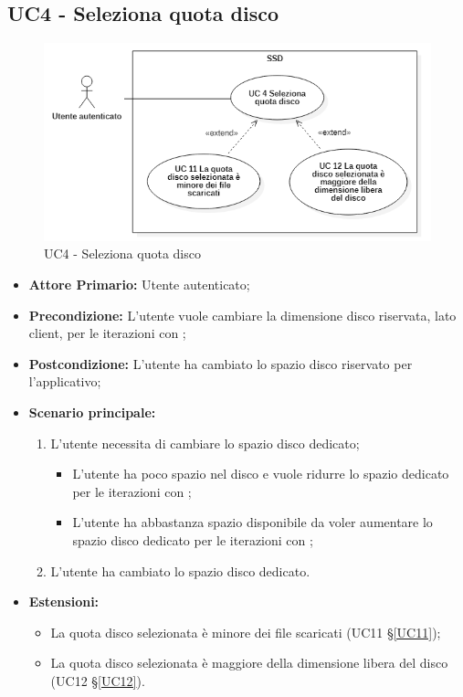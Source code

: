 \subsection{UC4 - Seleziona quota disco}
\begin{figure}[H]
    \centering
    \includegraphics[scale = 0.7]{components/img/UC4.png}
    \caption{UC4 - Seleziona quota disco}
\end{figure}
\begin{itemize}
\item \textbf{Attore Primario:} Utente autenticato;
\item \textbf{Precondizione:} L'utente vuole cambiare la dimensione disco riservata, lato client, per le iterazioni con ;
\item \textbf{Postcondizione:} L'utente ha cambiato lo spazio disco riservato per l'applicativo;
\item \textbf{Scenario principale:}
    \begin{enumerate}
    \item L'utente necessita di cambiare lo spazio disco dedicato;
        \begin{itemize}
        \item L'utente ha poco spazio nel disco e vuole ridurre lo spazio dedicato per le iterazioni con ;
        \item L'utente ha abbastanza spazio disponibile da voler aumentare lo spazio disco dedicato per le iterazioni con ;
        \end{itemize}
    \item L'utente ha cambiato lo spazio disco dedicato.
    \end{enumerate}
\item \textbf{Estensioni:}
    \begin{itemize}
        \item La quota disco selezionata è minore dei file scaricati (UC11 \S{}\ref{UC11});
        \item La quota disco selezionata è maggiore della dimensione libera del disco (UC12 \S{}\ref{UC12}).
    \end{itemize}
\end{itemize}